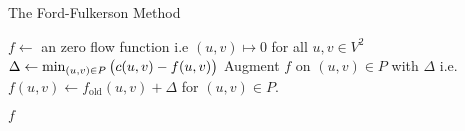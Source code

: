 \begin{algorithm}[H]
    \caption{The Ford-Fulkerson Method}
    \label{ch3:ford-fulkerson}

    \begin{algorithmic}[1]
        \State $f\gets$ an zero flow function \Comment i.e $(u,v)\mapsto 0$ for all $u,v\in V^2$
        \State $\Delta\gets \min_{(u,v)\in P} \del{c(u,v)-f(u,v)}$ 
        \State Augment $f$ on $(u,v)\in P$ with $\Delta$ \Comment i.e. $f(u,v)\gets f_{\text{old}}(u,v)+\Delta$ for $(u,v)\in P$. 
        \EndWhile

        \State \Return $f$ 
        \EndProcedure
    \end{algorithmic}
\end{algorithm}